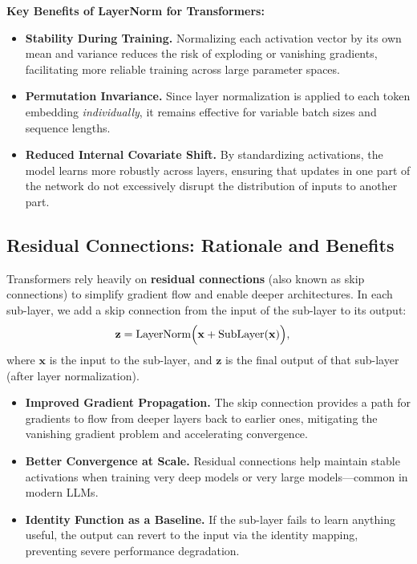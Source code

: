 \noindent
\textbf{Key Benefits of LayerNorm for Transformers:}
\begin{itemize}
    \item \textbf{Stability During Training.} Normalizing each activation vector by its own mean and variance reduces the risk of exploding or vanishing gradients, facilitating more reliable training across large parameter spaces.
    \item \textbf{Permutation Invariance.} Since layer normalization is applied to each token embedding \emph{individually}, it remains effective for variable batch sizes and sequence lengths.
    \item \textbf{Reduced Internal Covariate Shift.} By standardizing activations, the model learns more robustly across layers, ensuring that updates in one part of the network do not excessively disrupt the distribution of inputs to another part.
\end{itemize}

\subsection{Residual Connections: Rationale and Benefits}
\noindent
Transformers rely heavily on \textbf{residual connections} (also known as skip connections) to simplify gradient flow and enable deeper architectures. In each sub-layer, we add a skip connection from the input of the sub-layer to its output:
\begin{equation}
\begin{aligned}
\mathbf{z} &= \text{LayerNorm}\Bigl(\mathbf{x} + \text{SubLayer}(\mathbf{x})\Bigr),
\end{aligned}
\end{equation}
where $\mathbf{x}$ is the input to the sub-layer, and $\mathbf{z}$ is the final output of that sub-layer (after layer normalization).

\begin{itemize}
    \item \textbf{Improved Gradient Propagation.} The skip connection provides a path for gradients to flow from deeper layers back to earlier ones, mitigating the vanishing gradient problem and accelerating convergence.
    \item \textbf{Better Convergence at Scale.} Residual connections help maintain stable activations when training very deep models or very large models—common in modern LLMs.
    \item \textbf{Identity Function as a Baseline.} If the sub-layer fails to learn anything useful, the output can revert to the input via the identity mapping, preventing severe performance degradation.
\end{itemize}

